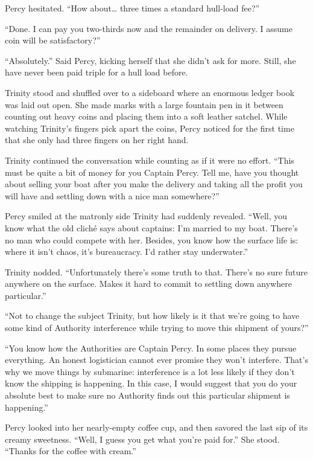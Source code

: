 \documentclass[]{scrbook}
\begin{document}
Percy hesitated. ``How about\ldots{} three times a standard hull-load
fee?''

``Done. I can pay you two-thirds now and the remainder on delivery. I
assume coin will be satisfactory?''

``Absolutely.'' Said Percy, kicking herself that she didn't ask for
more. Still, she have never been paid triple for a hull load before.

Trinity stood and shuffled over to a sideboard where an enormous ledger
book was laid out open. She made marks with a large fountain pen in it
between counting out heavy coins and placing them into a soft leather
satchel. While watching Trinity's fingers pick apart the coins, Percy
noticed for the first time that she only had three fingers on her right
hand.

Trinity continued the conversation while counting as if it were no
effort. ``This must be quite a bit of money for you Captain Percy. Tell
me, have you thought about selling your boat after you make the delivery
and taking all the profit you will have and settling down with a nice
man somewhere?''

Percy smiled at the matronly side Trinity had suddenly revealed. ``Well,
you know what the old cliché says about captains: I'm married to my
boat. There's no man who could compete with her. Besides, you know how
the surface life is: where it isn't chaos, it's bureaucracy. I'd rather
stay underwater.''

Trinity nodded. ``Unfortunately there's some truth to that. There's no
sure future anywhere on the surface. Makes it hard to commit to settling
down anywhere particular.''

``Not to change the subject Trinity, but how likely is it that we're
going to have some kind of Authority interference while trying to move
this shipment of yours?''

``You know how the Authorities are Captain Percy. In some places they
pursue everything. An honest logistician cannot ever promise they won't
interfere. That's why we move things by submarine: interference is a lot
less likely if they don't know the shipping is happening. In this case,
I would suggest that you do your absolute best to make sure no Authority
finds out this particular shipment is happening.''

Percy looked into her nearly-empty coffee cup, and then savored the last
sip of its creamy sweetness. ``Well, I guess you get what you're paid
for.'' She stood. ``Thanks for the coffee with cream.''
\end{document}
